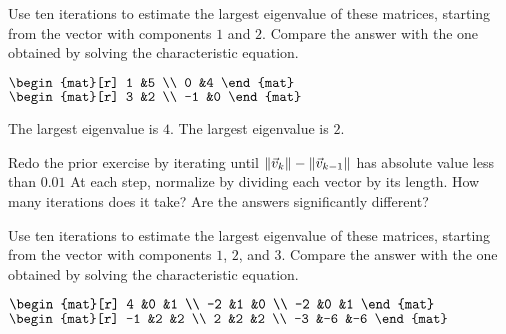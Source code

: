 \begin{exercises}
  \item 
    Use ten iterations to estimate the largest eigenvalue of these
    matrices, starting from the vector with components $1$ and $2$.
    Compare the answer with the one obtained by solving the characteristic
    equation.
    \begin{exparts*}
      \partsitem $\begin{mat}[r]
                    1  &5  \\
                    0  &4
                  \end{mat}$
      \partsitem $\begin{mat}[r]
                    3   &2  \\
                    -1  &0
                  \end{mat}$
    \end{exparts*}
    \begin{answer}
     \begin{exparts}
       \partsitem The largest eigenvalue is $4$.
       \partsitem The largest eigenvalue is $2$.
     \end{exparts}
    \end{answer}
  \item 
     Redo the prior exercise by iterating until 
     $\lVert\vec{v}_k\rVert-\lVert\vec{v}_{k-1}\rVert$ has absolute value less than
     $0.01$
     At each step, normalize by dividing each vector by its length.
     How many iterations does it take?
     Are the answers significantly different?
  \item 
    Use ten iterations to estimate the largest eigenvalue of these
    matrices, starting from the vector with components $1$, $2$, and $3$.
    Compare the answer with the one obtained by solving the characteristic
    equation.
    \begin{exparts*}
      \partsitem $\begin{mat}[r]
                    4   &0  &1 \\
                    -2  &1  &0  \\
                    -2  &0  &1
                  \end{mat}$
      \partsitem $\begin{mat}[r]
                   -1  &2  &2  \\
                    2  &2  &2  \\
                   -3  &-6 &-6
                  \end{mat}$
    \end{exparts*}

\end{exercises}
